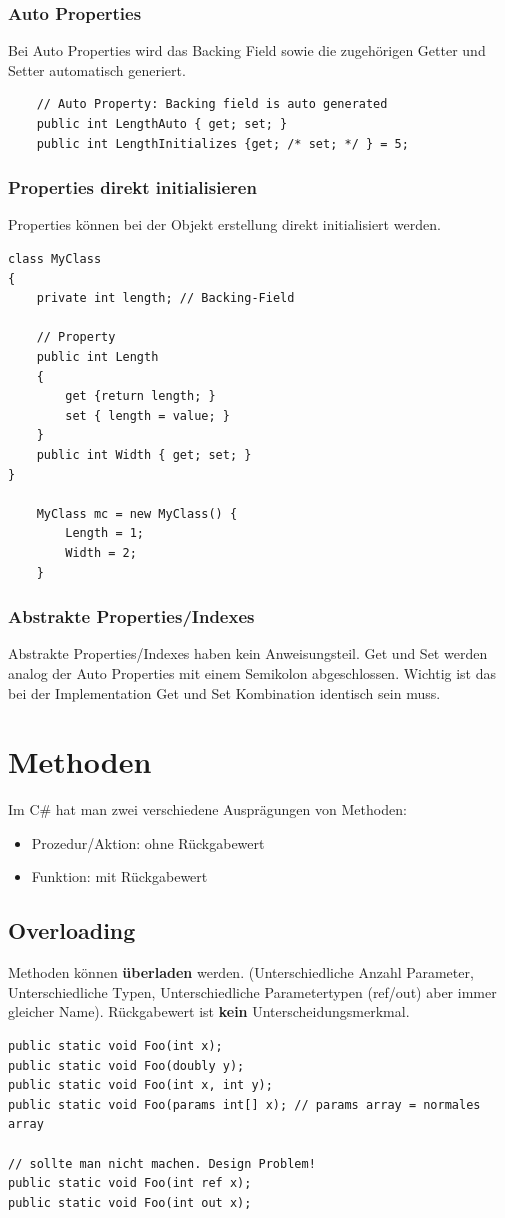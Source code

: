 \documentclass[
a4paper,
oneside,
10pt,
fleqn,
headsepline,
toc=listofnumbered, 
bibliography=totocnumbered]{scrartcl}
\let\stdsection\section
\renewcommand\section{\clearpage\stdsection}
\begin{document}
\subsubsection{Auto Properties}
Bei Auto Properties wird das Backing Field sowie die zugehörigen Getter und Setter automatisch generiert.
\begin{lstlisting}
	// Auto Property: Backing field is auto generated
	public int LengthAuto { get; set; }
	public int LengthInitializes {get; /* set; */ } = 5;
\end{lstlisting}

\subsubsection{Properties direkt initialisieren}
Properties können bei der Objekt erstellung direkt initialisiert werden.
\begin{lstlisting}
class MyClass
{
    private int length; // Backing-Field
    
    // Property
    public int Length 
    {
        get {return length; }
        set { length = value; } 
    }
    public int Width { get; set; } 
} 

	MyClass mc = new MyClass() {
		Length = 1;
		Width = 2;
	}
\end{lstlisting}

\subsubsection{Abstrakte Properties/Indexes}
Abstrakte Properties/Indexes haben kein Anweisungsteil. Get und Set werden analog der Auto Properties mit einem Semikolon abgeschlossen. Wichtig ist das bei der Implementation Get und Set Kombination identisch sein muss.

\section{Methoden}
Im C\# hat man zwei verschiedene Ausprägungen von Methoden:
\begin{itemize}
	\item Prozedur/Aktion: ohne Rückgabewert
	\item Funktion: mit Rückgabewert
\end{itemize}
\subsection{Overloading}
Methoden können \textbf{überladen} werden. (Unterschiedliche Anzahl Parameter, Unterschiedliche Typen, Unterschiedliche Parametertypen (ref/out) aber immer gleicher Name). Rückgabewert ist \textbf{kein} Unterscheidungsmerkmal.
\begin{lstlisting}
public static void Foo(int x);
public static void Foo(doubly y);
public static void Foo(int x, int y);
public static void Foo(params int[] x); // params array = normales array

// sollte man nicht machen. Design Problem!
public static void Foo(int ref x);
public static void Foo(int out x);
\end{lstlisting}
\end{document}

